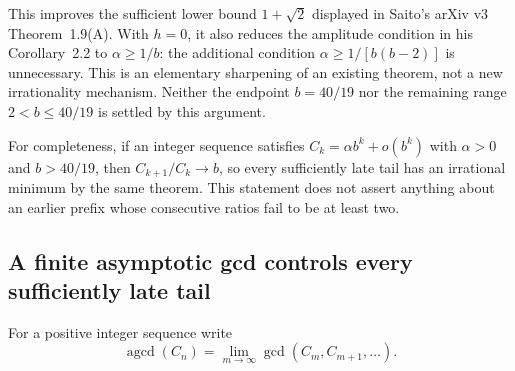 \documentclass[11pt,a4paper]{article}
\theoremstyle{definition}
\theoremstyle{remark}
\numberwithin{equation}{section}
\begin{document}
This improves the sufficient lower bound $1+\sqrt2$ displayed in
Saito's arXiv v3 Theorem~1.9(A). With $h=0$, it also reduces the amplitude
condition in his Corollary~2.2 to $\alpha\ge1/b$: the additional
condition $\alpha\ge1/[b(b-2)]$ is unnecessary. This is an elementary
sharpening of an existing theorem, not a new irrationality mechanism.
Neither the endpoint $b=40/19$ nor the remaining range
$2<b\le40/19$ is settled by this argument.

For completeness, if an integer sequence satisfies
$C_k=\alpha b^k+o(b^k)$ with $\alpha>0$ and $b>40/19$, then
$C_{k+1}/C_k\to b$, so every sufficiently late tail has an irrational
minimum by the same theorem. This statement does not assert anything
about an earlier prefix whose consecutive ratios fail to be at least two.

\subsection{A finite asymptotic gcd controls every sufficiently late tail}

For a positive integer sequence write
\[
 \operatorname{agcd}(C_n)=
 \lim_{m\to\infty}\gcd(C_m,C_{m+1},\ldots).
\]
\end{document}
